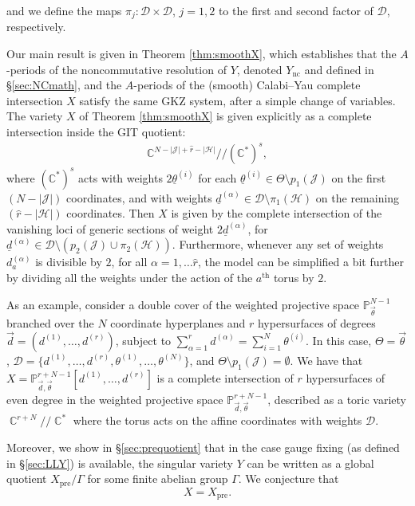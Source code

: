 \documentclass[12pt,a4paper,oneside]{amsart}
\numberwithin{equation}{section}
\theoremstyle{definition}
\theoremstyle{remark}
\DeclareMathOperator{\C}{\mathbb{C}}
\newcommand{\cP}{\mathbb{P}}
\newcommand{\Ync}{Y_{\mathrm{nc}}}
\newcommand{\Xpre}{X_{\mathrm{pre}}}
\begin{document}
and we define the maps $\pi_{j}\colon \mathcal{D} \times \mathcal{D}$, $j=1,2$ to the first and second factor of $\mathcal{D}$, respectively.\par 
Our main result is given in Theorem \ref{thm:smoothX}, which establishes that the $A$-periods of the noncommutative resolution of $Y$, denoted $\Ync$ and defined in \S\ref{sec:NCmath}, and the $A$-periods of the (smooth) Calabi--Yau complete intersection $X$ satisfy the same GKZ system, after a simple change of variables. The variety $X$ of Theorem \ref{thm:smoothX} is given explicitly as a complete intersection inside the GIT quotient:
\begin{eqnarray*}
\mathbb{C}^{N-\lvert\mathscr{J}\rvert +\hat{r}- \lvert \mathscr{H}\rvert} /\!\!/ (\mathbb{C}^{*})^{s} ,
\end{eqnarray*}
where $(\mathbb{C}^{*})^{s}$ acts with weights $2\underline{\theta}^{(i)}$ for each $\underline{\theta}^{(i)} \in \Theta\setminus p_{1}(\mathscr{J})$ on the first $(N-\lvert\mathscr{J}\rvert)$ coordinates, and with weights $\underline{d}^{(\alpha)} \in \mathcal{D}\setminus\pi_{1}(\mathscr{H})$ on the remaining $(\hat{r}- \lvert \mathscr{H}\rvert)$ coordinates. Then $X$ is given by the complete intersection of the vanishing loci of generic sections of weight $2\underline{d}^{(\alpha)}$, for $\underline{d}^{(\alpha)}\in\mathcal{D}\setminus(p_2(\mathscr{J})\cup\pi_2(\mathscr{H}))$. Furthermore, whenever any set of weights $d^{(\alpha)}_{a}$ is divisible by $2$, for all $\alpha=1,\ldots \hat{r}$, the model can be simplified a bit further by dividing all the weights under the action of the $a^{\text{th}}$ torus by $2$.\par
As an example, consider a double cover of the weighted projective space $\cP^{N-1}_{\vec{\theta}}$ branched over the $N$ coordinate hyperplanes and $r$ hypersurfaces of degrees $\vec{d}=(d^{(1)}, \dots, d^{(r)})$, subject to $\sum_{\alpha=1}^r d^{(\alpha)} = \sum_{i=1}^{N} \theta^{(i)}$. In this case, $\Theta=\vec{\theta}$, $\mathcal{D}=\{d^{(1)}, \dots, d^{(r)}, \theta^{(1)}, \dots, \theta^{(N)}\}$, and $\Theta\setminus p_{1}(\mathscr{J})=\emptyset$. We have that $X=\cP^{r+N-1}_{\vec{d},\vec{\theta}} \left[ d^{(1)}, \dots, d^{(r)}\right] $ is a complete intersection of $r$ hypersurfaces of even degree in the weighted projective space $\cP^{r+N-1}_{\vec{d},\vec{\theta}}$, described as a toric variety $\C^{r+N} /\!\!/\C^{\ast}$ where the torus acts on the affine coordinates with weights $\mathcal{D}$.\par
\medskip
Moreover, we show in \S\ref{sec:prequotient} that in the case gauge fixing (as defined in \S\ref{sec:LLY}) is available, the singular variety $Y$ can be written as a global quotient $\Xpre/\Gamma$ for some finite abelian group $\Gamma$. We conjecture that 
\begin{equation*}
X=\Xpre .
\end{equation*}
\end{document}
